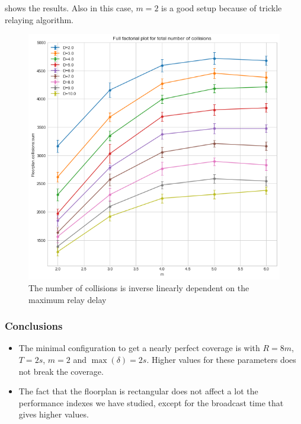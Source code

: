  shows the results.  Also in this case, \(m\!=\!2\)
is a good setup because of trickle relaying algorithm.

\begin{figure}
	\centering
	\includegraphics[width=\textwidth]{img/rect/collisions-m-ffplot.png}
	\caption{The number of collisions is inverse linearly dependent on the
	maximum	relay delay}\label{fig:rectcollisionsff}
\end{figure}

\subsubsection{Conclusions}\label{subsubsec:rectconclusions}

\begin{itemize}
	\item The minimal configuration to get a nearly perfect coverage is with
		\(R\!=\!8m\), \(T\!=\!2s\), \(m\!=\!2\) and
		\(\max(\delta)\!=\!2s\). Higher values for these parameters does
		not break the coverage.
	\item The fact that the floorplan is rectangular does not affect a lot
		the performance indexes we have studied, except for the
		broadcast time that gives higher values.
\end{itemize}
